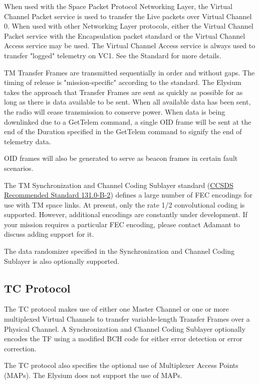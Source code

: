 \documentclass{hitec}
\begin{document}
When used with the Space Packet Protocol Networking Layer, the Virtual Channel
Packet service is used to transfer the Live packets over Virtual Channel 0.
When used with other Networking Layer protocols, either the Virtual Channel
Packet service with the Encapsulation packet standard or the Virtual Channel
Access service may be used. The Virtual Channel Access service is always used
to transfer "logged" telemetry on VC1. See the Standard for more details.

TM Transfer Frames are transmitted sequentially in order and without gaps. The
timing of release is "mission-specific" according to the standard. The Elysium
takes the approach that Transfer Frames are sent as quickly as possible for as
long as there is data available to be sent.  When all available data has been
sent, the radio will cease transmission to conserve power. When data is being
downlinked due to a GetTelem command, a single OID
frame will be sent at the end of the Duration specified in the GetTelem command
to signify the end of telemetry data.

OID frames will also be generated to serve as beacon frames in certain fault
scenarios. 

The TM Synchronization and Channel Coding Sublayer standard
(\href{https://public.ccsds.org/Pubs/131x0b2ec1.pdf}{CCSDS Recommended Standard
131.0-B-2}) defines a large number of FEC encodings for use with TM space
links. At present, only the rate 1/2 convolutional coding is supported.
However, additional encodings are constantly under development. If your mission
requires a particular FEC encoding, please contact Adamant to discuss adding
support for it.

The data randomizer specified in the Synchronization and Channel Coding
Sublayer is also optionally supported.

\subsection{TC Protocol}

The TC protocol makes use of either one Master Channel or one or more
multiplexed Virtual Channels to transfer variable-length Transfer Frames over a
Physical Channel. A Synchronization and Channel Coding Sublayer optionally
encodes the TF using a modified BCH code for either error detection or error
correction.

The TC protocol also specifies the optional use of Multiplexer Access Points
(MAPs). The Elysium does not support the use of MAPs.
\end{document}
